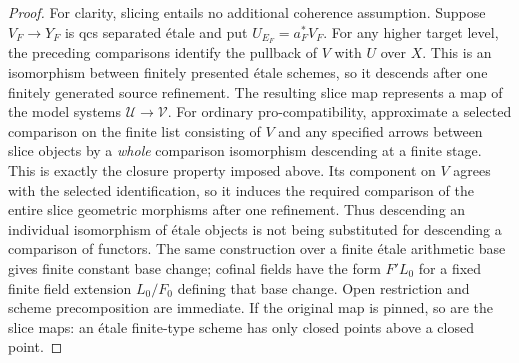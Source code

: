 \documentclass[11pt,a4paper]{article}
\begin{document}
\begin{proof}
For clarity, slicing entails no additional coherence assumption.
Suppose \(V_F\to Y_F\) is qcs separated étale and put
\(U_{E_F}=a_F^*V_F\). For any higher target level, the preceding
comparisons identify the pullback of \(V\) with \(U\) over \(X\).
This is an isomorphism between finitely presented étale schemes,
so it descends after one finitely generated source refinement.
The resulting slice map represents a map of the model systems
\(\mathcal U\to\mathcal V\). For ordinary pro-compatibility,
approximate a selected comparison on the finite list consisting
of \(V\) and any specified arrows between slice objects by a
\emph{whole} comparison isomorphism descending at a finite stage.
This is exactly the closure property imposed above. Its component
on \(V\) agrees with the selected identification, so it induces
the required comparison of the entire slice geometric morphisms
after one refinement. Thus descending an individual isomorphism
of étale objects is not being substituted for descending a
comparison of functors. The same construction
over a finite étale arithmetic base gives finite constant base
change; cofinal fields have the form \(F'L_0\) for a fixed finite
field extension \(L_0/F_0\) defining that base change. Open
restriction and scheme precomposition are immediate. If the
original map is pinned, so are the slice maps: an étale
finite-type scheme has only closed points above a closed point.
\end{proof}
\end{document}
